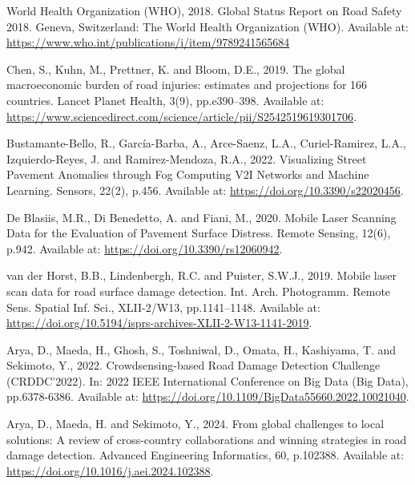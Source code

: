 
\begin{thebibliography}{99}
    
        World Health Organization (WHO), 2018. Global Status Report on Road Safety 2018. Geneva, Switzerland: The World Health Organization (WHO). Available at: \url{https://www.who.int/publications/i/item/9789241565684}

        Chen, S., Kuhn, M., Prettner, K. and Bloom, D.E., 2019. The global macroeconomic burden of road injuries: estimates and projections for 166 countries. Lancet Planet Health, 3(9), pp.e390–398. Available at: \url{https://www.sciencedirect.com/science/article/pii/S2542519619301706}.

        Bustamante-Bello, R., García-Barba, A., Arce-Saenz, L.A., Curiel-Ramirez, L.A., Izquierdo-Reyes, J. and Ramirez-Mendoza, R.A., 2022. Visualizing Street Pavement Anomalies through Fog Computing V2I Networks and Machine Learning. Sensors, 22(2), p.456. Available at: \url{https://doi.org/10.3390/s22020456}.

        De Blasiis, M.R., Di Benedetto, A. and Fiani, M., 2020. Mobile Laser Scanning Data for the Evaluation of Pavement Surface Distress. Remote Sensing, 12(6), p.942. Available at: \url{https://doi.org/10.3390/rs12060942}.

        van der Horst, B.B., Lindenbergh, R.C. and Puister, S.W.J., 2019. Mobile laser scan data for road surface damage detection. Int. Arch. Photogramm. Remote Sens. Spatial Inf. Sci., XLII-2/W13, pp.1141–1148. Available at: \url{https://doi.org/10.5194/isprs-archives-XLII-2-W13-1141-2019}.

        Arya, D., Maeda, H., Ghosh, S., Toshniwal, D., Omata, H., Kashiyama, T. and Sekimoto, Y., 2022. Crowdsensing-based Road Damage Detection Challenge (CRDDC’2022). In: 2022 IEEE International Conference on Big Data (Big Data), pp.6378-6386. Available at: \url{https://doi.org/10.1109/BigData55660.2022.10021040}.

        Arya, D., Maeda, H. and Sekimoto, Y., 2024. From global challenges to local solutions: A review of cross-country collaborations and winning strategies in road damage detection. Advanced Engineering Informatics, 60, p.102388. Available at: \url{https://doi.org/10.1016/j.aei.2024.102388}.


\end{thebibliography}
